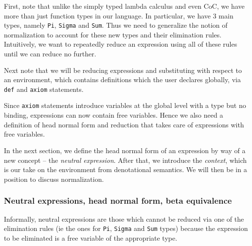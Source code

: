 \documentclass{article}
\begin{document}
First, note that unlike the simply typed lambda calculus and even CoC, we have more
than just function types in our language. In particular, we have 3 main types,
namely \verb|Pi|, \verb|Sigma| and \verb|Sum|.
Thus we need to generalize the notion of normalization to account for these new
types and their elimination rules. Intuitively, we want to repeatedly reduce
an expression using all of these rules until we can reduce no further.

Next note that we will be reducing expressions and substituting with
respect to an environment, which contains definitions which the user declares
globally, via \verb|def| and \verb|axiom| statements.

Since \verb|axiom| statements introduce variables at the global level with a
type but no binding, expressions can now contain free variables.
Hence we also need a definition of head normal form and reduction
that takes care of expressions with free variables.

In the next section, we define the head normal form of an expression by way of
a new concept -- the \textit{neutral expression}.
After that, we introduce the \textit{context}, which is our take on the
environment from denotational semantics.
We will then be in a position to discuss normalization.





\subsubsection{Neutral expressions, head normal form, beta equivalence}
Informally, neutral expressions are those which cannot be reduced via one of the 
elimination rules (ie the ones for \verb|Pi|, \verb|Sigma| and \verb|Sum| types)
because the expression to be eliminated is a free variable of the appropriate
type.
\end{document}
